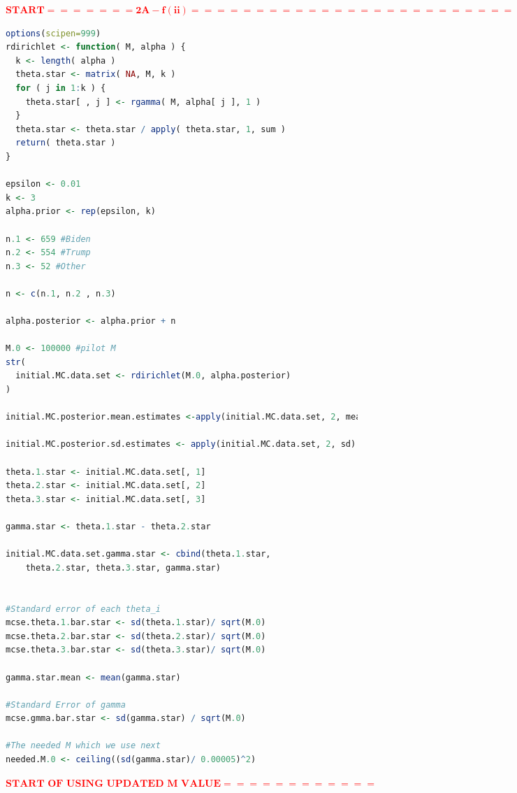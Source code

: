 \documentclass[12pt]{article}
\newcommand{\tcr}[1]{\textcolor{red}{#1}}
\begin{document}
\vspace*{1in}
\tcr{$\bm{START ======= 2A - f (ii) ==========================}$}
\begin{lstlisting}[language = R]
options(scipen=999)
rdirichlet <- function( M, alpha ) {
  k <- length( alpha )
  theta.star <- matrix( NA, M, k )
  for ( j in 1:k ) {
    theta.star[ , j ] <- rgamma( M, alpha[ j ], 1 )
  }
  theta.star <- theta.star / apply( theta.star, 1, sum )
  return( theta.star )
}

epsilon <- 0.01
k <- 3
alpha.prior <- rep(epsilon, k)

n.1 <- 659 #Biden
n.2 <- 554 #Trump
n.3 <- 52 #Other

n <- c(n.1, n.2 , n.3) 

alpha.posterior <- alpha.prior + n
 
M.0 <- 100000 #pilot M
str(
  initial.MC.data.set <- rdirichlet(M.0, alpha.posterior)
)

initial.MC.posterior.mean.estimates <-apply(initial.MC.data.set, 2, mean)

initial.MC.posterior.sd.estimates <- apply(initial.MC.data.set, 2, sd)

theta.1.star <- initial.MC.data.set[, 1]
theta.2.star <- initial.MC.data.set[, 2]
theta.3.star <- initial.MC.data.set[, 3]

gamma.star <- theta.1.star - theta.2.star

initial.MC.data.set.gamma.star <- cbind(theta.1.star, 
    theta.2.star, theta.3.star, gamma.star)


#Standard error of each theta_i
mcse.theta.1.bar.star <- sd(theta.1.star)/ sqrt(M.0)
mcse.theta.2.bar.star <- sd(theta.2.star)/ sqrt(M.0)
mcse.theta.3.bar.star <- sd(theta.3.star)/ sqrt(M.0)

gamma.star.mean <- mean(gamma.star)

#Standard Error of gamma
mcse.gmma.bar.star <- sd(gamma.star) / sqrt(M.0)

#The needed M which we use next
needed.M.0 <- ceiling((sd(gamma.star)/ 0.00005)^2)
\end{lstlisting}

\tcr{$\bm{\text{START OF USING UPDATED M VALUE}  ============}$}
\end{document}
